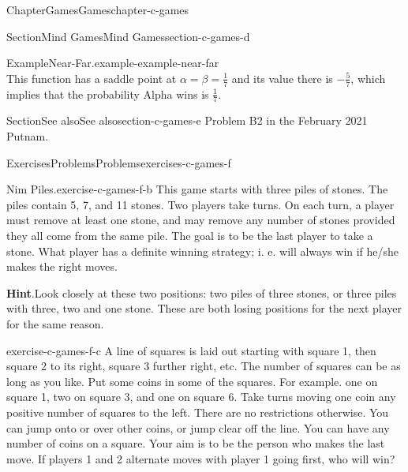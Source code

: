 \documentclass[oneside,10pt,]{book}
\newcommand{\blocktitlefont}{\relax}
\numberwithin{equation}{section}
\begin{document}
\begin{chapterptx}{Chapter}{Games}{}{Games}{}{}{chapter-c-games}
\begin{sectionptx}{Section}{Mind Games}{}{Mind Games}{}{}{section-c-games-d}
\begin{example}{Example}{Near-Far.}{example-example-near-far}
\begin{equation*}
\end{equation*}
This function has a saddle point at \(\alpha = \beta = \frac{1}{7}\) and its value there is \(-\frac{5}{7}\), which implies that the probability Alpha wins is \(\frac{1}{7}\).%
\end{example}
\end{sectionptx}
%
%
\typeout{************************************************}
\typeout{************************************************}
%
\begin{sectionptx}{Section}{See also}{}{See also}{}{}{section-c-games-e}
Problem B2 in the February 2021 Putnam.%
\end{sectionptx}
%
%
\typeout{************************************************}
\typeout{************************************************}
%
\begin{exercises-section}{Exercises}{Problems}{}{Problems}{}{}{exercises-c-games-f}
\begin{divisionexercise}{1}{Nim Piles.}{}{exercise-c-games-f-b}%
This game starts with three piles of stones. The piles contain 5, 7, and 11 stones. Two players take turns. On each turn, a player must remove at least one stone, and may remove any number of stones provided they all come from the same pile. The goal is to be the last player to take a stone. What player has a definite winning strategy; i. e. will always win if he\slash{}she makes the right moves.%
\par\smallskip%
\noindent\textbf{\blocktitlefont Hint}.\hypertarget{hint-c-games-f-b-c}{}\quad{}Look closely at these two positions: two piles of three stones, or three piles with three, two and one stone.   These are both losing positions for the next player for the same reason.%
\end{divisionexercise}%
\begin{divisionexercise}{2}{}{}{exercise-c-games-f-c}%
A line of squares is laid out starting with square 1, then square 2 to its right, square 3 further right, etc.  The number of squares can be as long as you like. Put some coins in some of the squares.  For example.  one on square 1, two on square 3, and one on square 6.  Take turns moving one coin any positive number of squares to the left. There are no restrictions otherwise. You can jump onto or over other coins, or jump clear off the line. You can have any number of coins on a square. Your aim is to be the person who makes the last move.   If players 1 and 2 alternate moves with player 1 going first, who will win?%

\end{divisionexercise}
\end{exercises-section}
\end{chapterptx}
\end{document}
